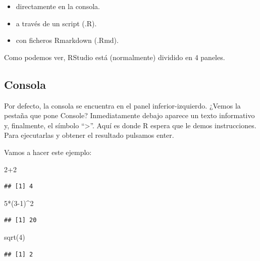 \documentclass[
]{book}
\newenvironment{Shaded}{\begin{snugshade}}{\end{snugshade}}
\newcommand{\DecValTok}[1]{\textcolor[rgb]{0.00,0.00,0.81}{#1}}
\newcommand{\FunctionTok}[1]{\textcolor[rgb]{0.00,0.00,0.00}{#1}}
\newcommand{\NormalTok}[1]{#1}
\newcommand{\SpecialCharTok}[1]{\textcolor[rgb]{0.00,0.00,0.00}{#1}}
\begin{document}
\begin{itemize}
\item
  directamente en la consola.
\item
  a través de un script (.R).
\item
  con ficheros Rmarkdown (.Rmd).
\end{itemize}

Como podemos ver, RStudio está (normalmente) dividido en 4 paneles.

\hypertarget{consola}{%
\subsection{Consola}\label{consola}}

Por defecto, la consola se encuentra en el panel inferior-izquierdo. ¿Vemos la pestaña que pone Console? Inmediatamente debajo aparece un texto informativo y, finalmente, el símbolo ``\textgreater{}''. Aquí es donde R espera que le demos instrucciones. Para ejecutarlas y obtener el resultado pulsamos enter.

Vamos a hacer este ejemplo:

\begin{Shaded}
\begin{Highlighting}[]
\DecValTok{2}\SpecialCharTok{+}\DecValTok{2}
\end{Highlighting}
\end{Shaded}

\begin{verbatim}
## [1] 4
\end{verbatim}

\begin{Shaded}
\begin{Highlighting}[]
\DecValTok{5}\SpecialCharTok{*}\NormalTok{(}\DecValTok{3{-}1}\NormalTok{)}\SpecialCharTok{\^{}}\DecValTok{2}
\end{Highlighting}
\end{Shaded}

\begin{verbatim}
## [1] 20
\end{verbatim}

\begin{Shaded}
\begin{Highlighting}[]
\FunctionTok{sqrt}\NormalTok{(}\DecValTok{4}\NormalTok{)}
\end{Highlighting}
\end{Shaded}

\begin{verbatim}
## [1] 2
\end{verbatim}
\end{document}
